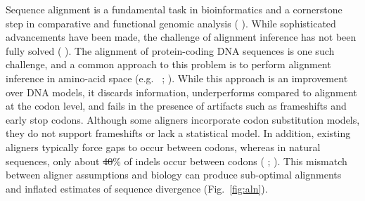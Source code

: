 \documentclass[12pt,letterpaper]{article}
\renewcommand{\cite}[1]{\citeauthor{#1} \citeyear{#1}}
\newcommand{\citetwo}[2]{\cite{#1}; \cite{#2}}
\newcommand{\citembe}[1]{(\cite{#1})}
\newcommand{\citembetwo}[2]{(\citetwo{#1}{#2})}
\providecommand{\DIFaddtex}[1]{{\protect\color{blue}\uwave{#1}}} %
\providecommand{\DIFdeltex}[1]{{\protect\color{red}\sout{#1}}}                      %
\providecommand{\DIFaddbegin}{} %
\providecommand{\DIFaddend}{} %
\providecommand{\DIFdelbegin}{} %
\providecommand{\DIFdelend}{} %
\providecommand{\DIFadd}[1]{\texorpdfstring{\DIFaddtex{#1}}{#1}} %
\providecommand{\DIFdel}[1]{\texorpdfstring{\DIFdeltex{#1}}{}} %
\newcommand{\DIFscaledelfig}{0.5}
\newlength{\DIFdelgraphicswidth} %
\newlength{\DIFdelgraphicsheight} %
\newcommand{\DIFaddincludegraphics}[2][]{{\color{blue}\fbox{\DIFOincludegraphics[#1]{#2}}}} %
\newcommand{\DIFdelincludegraphics}[2][]{%
\sbox{\DIFdelgraphicsbox}{\DIFOincludegraphics[#1]{#2}}%
\settoboxwidth{\DIFdelgraphicswidth}{\DIFdelgraphicsbox} %
\settoboxtotalheight{\DIFdelgraphicsheight}{\DIFdelgraphicsbox} %
\scalebox{\DIFscaledelfig}{%
\parbox[b]{\DIFdelgraphicswidth}{\usebox{\DIFdelgraphicsbox}\\[-\baselineskip] \rule{\DIFdelgraphicswidth}{0em}}\llap{\resizebox{\DIFdelgraphicswidth}{\DIFdelgraphicsheight}{%
\setlength{\unitlength}{\DIFdelgraphicswidth}%
\begin{picture}(1,1)%
\thicklines\linethickness{2pt} %
{\color[rgb]{1,0,0}\put(0,0){\framebox(1,1){}}}%
{\color[rgb]{1,0,0}\put(0,0){\line( 1,1){1}}}%
{\color[rgb]{1,0,0}\put(0,1){\line(1,-1){1}}}%
\end{picture}%
}\hspace*{3pt}}} %
} %
\DeclareRobustCommand{\DIFaddbegin}{\DIFOaddbegin \let\includegraphics\DIFaddincludegraphics} %
\DeclareRobustCommand{\DIFaddend}{\DIFOaddend \let\includegraphics\DIFOincludegraphics} %
\DeclareRobustCommand{\DIFdelbegin}{\DIFOdelbegin \let\includegraphics\DIFdelincludegraphics} %
\DeclareRobustCommand{\DIFdelend}{\DIFOaddend \let\includegraphics\DIFOincludegraphics} %
\begin{document}
Sequence alignment is a fundamental task in bioinformatics and a cornerstone step in comparative and functional genomic analysis \citembe{sequence_alignment_rosenberg_2009}. While sophisticated advancements have been made, the challenge of alignment inference has not been fully solved \citembe{art_morrison_2015}.
%
The alignment of protein-coding DNA sequences is one such challenge, and a common approach to this problem is to perform alignment inference in amino-acid space (e.g.\ \citetwo{bininda2005transalign}{abascal2010translatorx}).
While this approach is an improvement over DNA models, it discards information, underperforms compared to alignment at the codon level, and fails in the presence of artifacts such as frameshifts and early stop codons.
Although some aligners incorporate codon substitution models, they do not support frameshifts or lack a statistical model.
In addition, existing aligners typically force gaps to occur between codons, whereas in natural sequences, only about \DIFdelbegin \DIFdel{40}\DIFdelend \DIFaddbegin \DIFadd{42}\DIFaddend \% of indels occur between codons \citembetwo{taylor2004occurrence}{zhu2022profiling}.
This mismatch between aligner assumptions and biology can produce sub-optimal alignments and inflated estimates of sequence divergence (Fig.\ \ref{fig:aln}).
\end{document}
